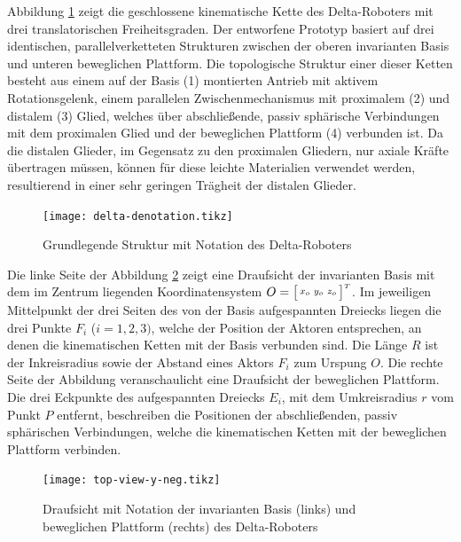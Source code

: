 \documentclass[Bachelor, BMR, ngerman]{twbook}
\begin{document}
    Abbildung \ref{fig:delta-denotation} zeigt die geschlossene kinematische Kette des Delta-Roboters mit drei translatorischen Freiheitsgraden. Der entworfene Prototyp basiert auf drei identischen, parallelverketteten Strukturen zwischen der oberen invarianten Basis und unteren beweglichen Plattform. Die topologische Struktur einer dieser Ketten besteht aus einem auf der Basis (1) montierten Antrieb mit aktivem Rotationsgelenk, einem parallelen Zwischenmechanismus mit proximalem (2) und distalem (3) Glied, welches über abschließende, passiv sphärische Verbindungen mit dem proximalen Glied und der beweglichen Plattform (4) verbunden ist. Da die distalen Glieder, im Gegensatz zu den proximalen Gliedern, nur axiale Kräfte übertragen müssen, können für diese leichte Materialien verwendet werden, resultierend in einer sehr geringen Trägheit der distalen Glieder.\\
    \begin{figure}[H]
        \centering
        {
            \texttt{[image: delta-denotation.tikz]}
        }
        \caption[Grundlegende Struktur mit Notation des Delta-Roboters]{Grundlegende Struktur mit Notation des Delta-Roboters }
        \label{fig:delta-denotation}
    \end{figure}
    \noindent
    Die linke Seite der Abbildung \ref{fig:top-view} zeigt eine Draufsicht der invarianten Basis mit dem im Zentrum liegenden Koordinatensystem $O = \bigl[ \begin{smallmatrix} x_o & y_o & z_o \end{smallmatrix} \bigr]^{\mathsmaller T}$. Im jeweiligen Mittelpunkt der drei Seiten des von der Basis aufgespannten Dreiecks liegen die drei Punkte $F_i$ ($i = 1, 2, 3)$, welche der Position der Aktoren entsprechen, an denen die kinematischen Ketten mit der Basis verbunden sind. Die Länge $R$ ist der Inkreisradius sowie der Abstand eines Aktors $F_i$ zum Urspung $O$. Die rechte Seite der Abbildung veranschaulicht eine Draufsicht der beweglichen Plattform. Die drei Eckpunkte des aufgespannten Dreiecks $E_i$, mit dem Umkreisradius $r$ vom Punkt $P$ entfernt, beschreiben die Positionen der abschließenden, passiv sphärischen Verbindungen, welche die kinematischen Ketten mit der beweglichen Plattform verbinden.
    \begin{figure}[H]
        \centering
        {
            \texttt{[image: top-view-y-neg.tikz]}
        }
        \caption[Draufsicht mit Notation der invarianten Basis (links) und beweglichen Plattform (rechts) des Delta-Roboters]{Draufsicht mit Notation der invarianten Basis (links) und beweglichen Plattform (rechts) des Delta-Roboters}
        \label{fig:top-view}
    \end{figure}
\end{document}
